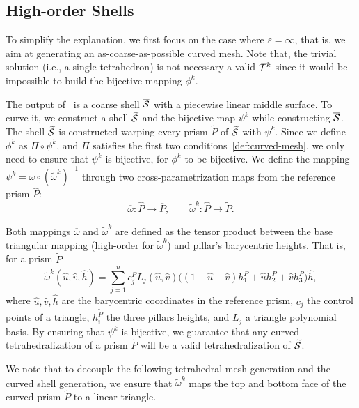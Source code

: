 \subsection{High-order Shells}\label{cumin:sec:high-order}
To simplify the explanation, we first focus on the case where $\varepsilon = \infty$, that is, we aim at generating {an} as-coarse-as-possible curved mesh. Note that, the trivial solution (i.e., a single tetrahedron) is not necessary a valid $\mathcal{T}^k$ since it would be impossible to build the bijective mapping $\phi^k$.

The output of~\cite{jiang2020bijective} is a coarse shell $\overline{\mathcal{S}}$ with {a} piecewise linear middle surface. To curve it, we construct a shell $\widetilde{\mathcal{S}}$ and the bijective map $\psi^k$ while constructing $\overline{\mathcal{S}}$. 
The shell $\widetilde{\mathcal{S}}$ is constructed warping every prism $\widetilde P$ of $\widetilde{\mathcal{S}}$ with $\psi^k$. Since we define $\phi^k$ as  $\Pi \circ \psi^k$, and $\Pi$ satisfies the first two conditions~\ref{def:curved-mesh}, we only need to ensure that $\psi^k$ is bijective, for $\phi^k$ to be bijective.  We define the mapping $\psi^k = \overline\omega\circ(\widetilde\omega^k)^{-1}$ {through} two {cross-parametrization} maps from the reference prism $\hat P$: 
\[
\overline\omega \colon \hat P \to \overline P, \qquad
\widetilde\omega^k \colon \hat P \to \widetilde P.
\]

Both mappings $\overline\omega$ and $\widetilde\omega^k$ are defined as the tensor product between the base triangular mapping (high-order for $\widetilde\omega^k$) and pillar's {barycentric} heights. That is, for a prism $\widetilde P$
\[
\widetilde\omega^k (\hat u,\hat v, \hat h) = 
\sum_{j=1}^n c_j^P L_j(\hat u,\hat v) \big((1-\hat u - \hat v)  h_1^{\widetilde P}+ \hat u h_2^{\widetilde P} + \hat v  h_3^{\widetilde P}\big)\hat h,
\]
where $\hat u,\hat v,\hat h$ are the barycentric coordinates in the reference prism, $c_j$ the control points of a triangle, $h_i^{\widetilde P}$ the three pillars heights, and $L_j$ a triangle polynomial basis.
By ensuring that $\psi^k$ is bijective, we guarantee that any curved tetrahedralization of a prism $\widetilde P$ will be a valid tetrahedralization of $\widetilde{\mathcal{S}}$.

We note that to decouple the following tetrahedral mesh generation and the curved shell generation, we ensure that $\widetilde\omega^k$ maps the top and bottom face of the curved prism $\widetilde P$ to a linear triangle.


